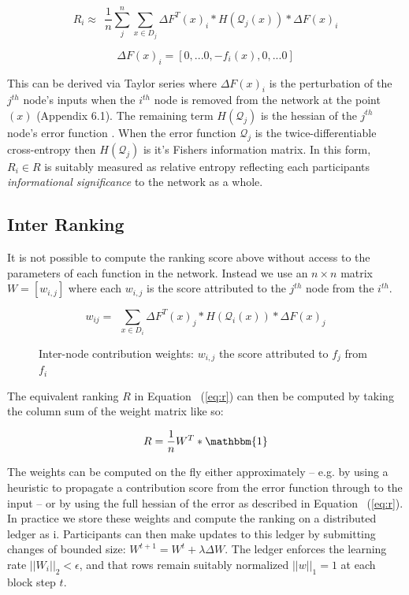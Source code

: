 \documentclass{article}
\begin{document}
\begin{equation}
\label{eq:r}
R_i \approx \ \ \frac{1}{n} \sum_{j}^{n} \sum_{x \in D_j} \Delta F^T(x)_i * H(\mathcal{Q}_j(x)) * \Delta F(x)_i 
\end{equation}

\[ \Delta F (x)_i = [0, ... 0, -f_i(x), 0, ... 0] \]

 This can be derived via Taylor series where $\Delta F (x)_i$ is the perturbation of the $j^{th}$ node's inputs when the $i^{th}$ node is removed from the network at the point $(x)$ (Appendix 6.1). The remaining term $H(\mathcal{Q}_j)$ is the hessian of the $j^{th}$ node's error function \cite{yu2017nisp}. When the error function $\mathcal{Q}_j$ is the twice-differentiable cross-entropy then $H(\mathcal{Q}_j)$ is it's Fishers information matrix. In this form, $R_i \in R$ is suitably measured as relative entropy reflecting each participants \textit{informational significance} to the network as a whole.

\subsection{Inter Ranking}
\label{sec:inter-ranking}
It is not possible to compute the ranking score above without access to the parameters of each function in the network. Instead we use an $n \times n$ matrix $W = [w_{i,j}]$ where each $w_{i,j}$ is the score attributed to the $j^{th}$ node from the $i^{th}$. 

\begin{equation}
\label{eq:w}
w_{ij} = \ \ \sum_{x \in D_i} \Delta F^T(x)_j * H(\mathcal{Q}_i(x)) * \Delta F(x)_j
\end{equation}

\begin{figure}[H]
	\centering
	\hspace*{-2cm}
	
	\caption{Inter-node contribution weights: $w_{i,j}$ the score attributed to $f_j$ from $f_i$}
\end{figure}{}

The equivalent ranking $R$ in Equation ~(\ref{eq:r}) can then be computed by taking the column sum of the weight matrix like so:

\begin{equation}
\label{eq:equiv_ranking}
R = \frac{1}{n} W^T * \mathbbm{1}
\end{equation}

The weights can be computed on the fly either approximately -- e.g. by using a heuristic to propagate a contribution score from the error function through to the input \cite{yu2017nisp} -- or by using the full hessian of the error as described in Equation ~(\ref{eq:r}). In practice we store these weights and compute the ranking on a distributed ledger as i. Participants can then make updates to this ledger by submitting changes of bounded size: $W^{t+1}= W^t + \lambda \Delta W$. The ledger enforces the learning rate $||W_i||_2 < \epsilon$, and that rows remain suitably normalized $||w||_1 = 1$ at each block step $t$.  
\end{document}
